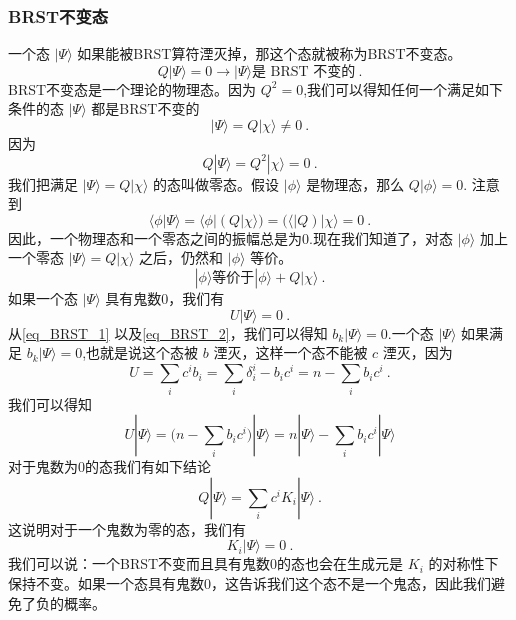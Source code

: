 \subsubsection{BRST不变态}
一个态 $|\Psi\rangle$ 如果能被BRST算符湮灭掉，那这个态就被称为BRST不变态。
\begin{equation}
Q|\Psi\rangle = 0 \rightarrow |\Psi\rangle \text{是 BRST 不变的}~.
\end{equation}
BRST不变态是一个理论的物理态。因为 $Q^2=0$,我们可以得知任何一个满足如下条件的态 $|\Psi\rangle$ 都是BRST不变的
\begin{equation}
|\Psi\rangle = Q |\chi\rangle \neq 0~.
\end{equation}
因为
\begin{equation}
Q|\Psi\rangle = Q^2 |\chi\rangle = 0~.
\end{equation}
我们把满足 $|\Psi\rangle=Q|\chi\rangle$ 的态叫做零态。假设 $|\phi\rangle$ 是物理态，那么 $Q|\phi\rangle=0$. 注意到
\begin{equation}
\langle\phi|\Psi\rangle = \langle\phi|(Q|\chi\rangle) = (\langle | Q) |\chi\rangle = 0~.
\end{equation}
因此，一个物理态和一个零态之间的振幅总是为0.现在我们知道了，对态 $|\phi\rangle$ 加上一个零态 $|\Psi\rangle = Q|\chi\rangle$ 之后，仍然和 $|\phi\rangle$ 等价。
\begin{equation}
|\phi\rangle \text{等价于} |\phi\rangle+Q|\chi\rangle~.
\end{equation}
如果一个态 $|\Psi\rangle$ 具有鬼数0，我们有
\begin{equation}\label{eq_BRST_2}
U|\Psi\rangle = 0~.
\end{equation}
从\autoref{eq_BRST_1} 以及\autoref{eq_BRST_2}，我们可以得知 $b_k|\Psi\rangle = 0$.一个态 $|\Psi\rangle$ 如果满足 $b_k|\Psi\rangle = 0$,也就是说这个态被 $b$ 湮灭，这样一个态不能被 $c$ 湮灭，因为
\begin{equation}
U = \sum_i c^i b_i = \sum_i \delta^i_i - b_i c^i = n - \sum_i b_i c^i~.
\end{equation}
我们可以得知
\begin{equation}
U|\Psi\rangle = \bigg( n - \sum_i b_i c^i \bigg) | \Psi\rangle = n|\Psi\rangle - \sum_i b_i c^i |\Psi\rangle
\end{equation}
对于鬼数为0的态我们有如下结论
\begin{equation}
Q|\Psi\rangle = \sum_i c^i K_i |\Psi\rangle~.
\end{equation}
这说明对于一个鬼数为零的态，我们有
\begin{equation}
K_i|\Psi\rangle = 0~.
\end{equation}
我们可以说：一个BRST不变而且具有鬼数0的态也会在生成元是 $K_i$ 的对称性下保持不变。如果一个态具有鬼数0，这告诉我们这个态不是一个鬼态，因此我们避免了负的概率。

